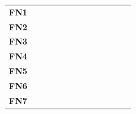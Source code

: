 \begin{table}
\begin{tabularx}{\textwidth}{ c *{12}{Y} }
    \textbf{FN1}  &                                   &                                       &                                         &                                           &                                        &                                         &             &            &             &            &             &            \\
    \textbf{FN2}  &                                   &                                       &                                         &                                           &                                        &                                         &             &            &             &            &             &            \\
    \textbf{FN3}  &                                   &                                       &                                         &                                           &                                        &                                         &             &            &             &            &             &            \\
    \textbf{FN4}  &                                   &                                       &                                         &                                           &                                        &                                         &             &            &             &            &             &            \\
    \textbf{FN5}  &                                   &                                       &                                         &                                           &                                        &                                         &             &            &             &            &             &            \\
    \textbf{FN6}  &                                   &                                       &                                         &                                           &                                        &                                         &             &            &             &            &             &            \\
    \textbf{FN7}  &                                   &                                       &                                         &                                           &                                        &                                         &             &            &             &            &             &            \\

\end{tabularx}
\end{table}
